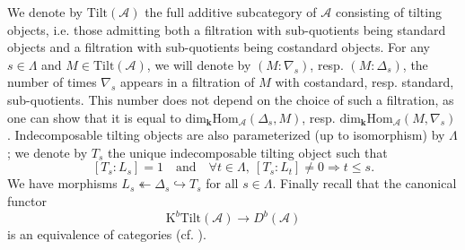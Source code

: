 \documentclass[11pt]{amsart}
\theoremstyle{plain}
\theoremstyle{remark}
\numberwithin{equation}{section}
\begin{document}
	We denote by $\mathrm{Tilt}(\mathcal{A})$ the full additive subcategory of $\mathcal{A}$ consisting of tilting objects, i.e. those admitting both a filtration with sub-quotients being standard objects and a filtration with sub-quotients being costandard objects. For any $s\in\Lambda$ and $M\in \mathrm{Tilt}(\mathcal{A})$, we will denote by $(M:\nabla_s)$, resp. $(M:\Delta_s)$, the number of times $\nabla_s$ appears in a filtration of $M$ with costandard, resp. standard, sub-quotients. This number does not depend on the choice of such a filtration, as one can show that it is equal to $\mathrm{dim}_\mathbf{k}\mathrm{Hom}_\mathcal{A}(\Delta_s,M)$, resp. $\mathrm{dim}_\mathbf{k}\mathrm{Hom}_\mathcal{A}(M,\nabla_s)$. Indecomposable tilting objects are also parameterized (up to isomorphism) by $\Lambda$; we denote by $T_s$ the unique indecomposable tilting object such that 
	$$ [T_s:L_s]=1\quad\text{and}\quad \forall t\in\Lambda,~ [T_s:L_t]\neq0 \Rightarrow t\leq s.$$
	We have morphisms $L_s\twoheadleftarrow\Delta_s\hookrightarrow  T_s$ for all $s\in\Lambda$. Finally recall that the canonical functor 
	\begin{equation}\label{equivalence0}
		\mathrm{K}^b\mathrm{Tilt}(\mathcal{A})\to D^b(\mathcal{A})
	\end{equation}
	is an equivalence of categories (cf. \cite[Proposition 7.17]{riche}).
	
\end{document}
